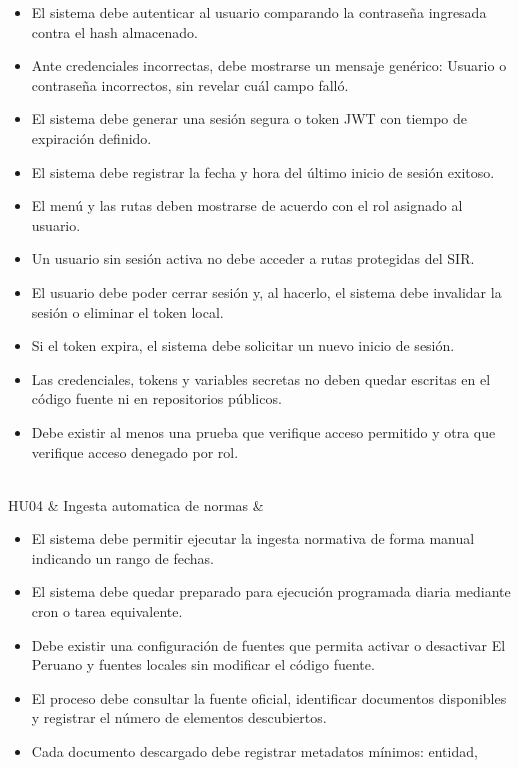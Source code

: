 \documentclass[12pt,a4paper,oneside]{report}
\begin{document}
\begin{longtable}[]
\begin{minipage}[t]{\linewidth}
\begin{itemize}
\item
  El sistema debe autenticar al usuario comparando la contraseña
  ingresada contra el hash almacenado.
\item
  Ante credenciales incorrectas, debe mostrarse un mensaje genérico:
  Usuario o contraseña incorrectos, sin revelar cuál campo falló.
\item
  El sistema debe generar una sesión segura o token JWT con tiempo de
  expiración definido.
\item
  El sistema debe registrar la fecha y hora del último inicio de sesión
  exitoso.
\item
  El menú y las rutas deben mostrarse de acuerdo con el rol asignado al
  usuario.
\item
  Un usuario sin sesión activa no debe acceder a rutas protegidas del
  SIR.
\item
  El usuario debe poder cerrar sesión y, al hacerlo, el sistema debe
  invalidar la sesión o eliminar el token local.
\item
  Si el token expira, el sistema debe solicitar un nuevo inicio de
  sesión.
\item
  Las credenciales, tokens y variables secretas no deben quedar escritas
  en el código fuente ni en repositorios públicos.
\item
  Debe existir al menos una prueba que verifique acceso permitido y otra
  que verifique acceso denegado por rol.
\end{itemize}
\end{minipage} \\
HU04 & Ingesta automatica de normas &
\begin{minipage}[t]{\linewidth}\raggedright
\begin{itemize}
\item
  El sistema debe permitir ejecutar la ingesta normativa de forma manual
  indicando un rango de fechas.
\item
  El sistema debe quedar preparado para ejecución programada diaria
  mediante cron o tarea equivalente.
\item
  Debe existir una configuración de fuentes que permita activar o
  desactivar El Peruano y fuentes locales sin modificar el código
  fuente.
\item
  El proceso debe consultar la fuente oficial, identificar documentos
  disponibles y registrar el número de elementos descubiertos.
\item
  Cada documento descargado debe registrar metadatos mínimos: entidad,

\end{itemize}
\end{minipage}
\end{longtable}
\end{document}
